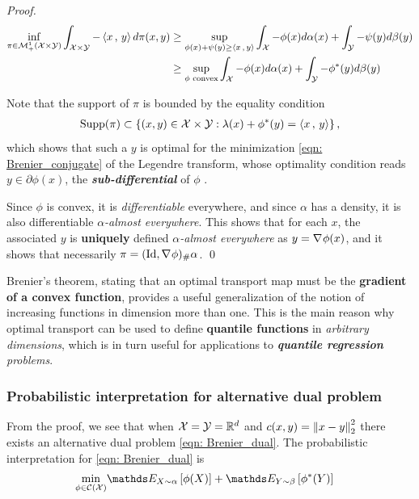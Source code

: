\documentclass[11pt]{article}
\begin{document}
\begin{proof}
\begin{align*}
\inf_{\pi \in {\mathcal M}_{+}^{1}({\mathcal X} \times {\mathcal Y})} \int_{{\mathcal X} \times {\mathcal Y}} -\left\langle x\,,\, y \right\rangle d \pi(x, y) &\ge \sup_{\phi(x) + \psi(y) \ge \left\langle x\,,\, y \right\rangle}\int_{{\mathcal X}}-\phi(x) d\alpha(x) + \int_{{\mathcal Y}}-\psi(y) d\beta(y) \\
&\ge \sup_{\phi \text{ convex}}\int_{{\mathcal X}}-\phi(x) d\alpha(x) + \int_{{\mathcal Y}}-\phi^{*}(y) d\beta(y)
\end{align*}

Note that the support of $\pi$ is bounded by the equality condition
\begin{align}
\text{Supp}(\pi)  \subset \left\{(x, y) \in {\mathcal X} \times {\mathcal Y}:  \lambda(x) + \phi^{*}(y) = \left\langle x\,,\, y \right\rangle\right\},
\end{align} which shows that such a $y$ is optimal for the minimization \eqref{eqn: Brenier_conjugate} of the Legendre transform, whose optimality condition reads
$y \in \partial \phi(x)$, the \emph{\textbf{sub-differential}} of $\phi$ \citep{rockafellar1970convex}. 

Since $\phi$ is convex, it is \emph{differentiable} everywhere,  and since $\alpha$ has a density, it is also differentiable \emph{$\alpha$-almost everywhere}.  This shows that for each $x$, the associated $y$ is \textbf{uniquely} defined \emph{$\alpha$-almost everywhere} as $y = \nabla_{}{\phi}(x)$, and it shows that necessarily $\pi = (\text{Id}, \nabla_{}{\phi})_{\#}\alpha$.
\qed
\end{proof}

Brenier's theorem, stating that an optimal transport map must be the \textbf{gradient of a convex function}, provides a useful generalization of the notion of increasing functions in dimension more than one. This is the main reason why optimal transport can be used to define \textbf{quantile functions} in \emph{arbitrary dimensions}, which is in turn useful for applications to \emph{\textbf{quantile regression} problems}.

\subsubsection{Probabilistic interpretation for alternative dual problem}
From the proof, we see that when ${\mathcal X} = {\mathcal Y} = {\mathbb R}^d$ and $c(x, y) = \left\|x -y\right\|_{2}^2$ there exists an alternative dual problem \eqref{eqn: Brenier_dual}. The probabilistic interpretation for \eqref{eqn: Brenier_dual} is
\begin{align}
\min_{\phi\in \cC(\cX)} & \E{X \sim \alpha}{\phi(X)} +  \E{Y \sim \beta}{\phi^{*}(Y)} \label{eqn: Brenier_dual_prob}
\end{align}
\end{document}
